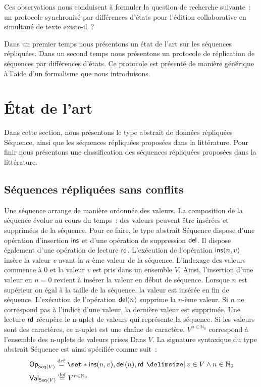 Ces observations nous conduisent à formuler la question de recherche suivante~: un protocole synchronisé par différences d'états pour l'édition collaborative en simultané de texte existe-il~?

Dans un premier temps nous présentons un état de l'art sur les séquences répliquées.
Dans un second temps nous présentons un protocole de réplication de séquences par différences d'états.
Ce protocole est présenté de manière générique à l'aide d'un formalisme que nous introduisons.


\section{État de l'art}\label{sec:state-art-seq}

Dans cette section, nous présentons le type abstrait de données répliquées Séquence, ainsi que les séquences répliquées proposées dans la littérature.
Pour finir nous présentons une classification des séquences répliquées proposées dans la littérature.

\subsection{Séquences répliquées sans conflits}\label{subsec:replseq}

Une séquence arrange de manière ordonnée des valeurs.
La composition de la séquence évolue au cours du temps~:
des valeurs peuvent être insérées et supprimées de la séquence.
Pour ce faire, le type abstrait Séquence dispose d'une opération d'insertion $\operatorname{\mathsf{ins}}$ et d'une opération de suppression $\operatorname{\mathsf{del}}$.
Il dispose également d'une opération de lecture $\operatorname{\mathsf{rd}}$.
L'exécution de l'opération $\operatorname{\mathsf{ins}}(n, v)$ insère la valeur $v$ avant la $n$-ème valeur de la séquence.
L'indexage des valeurs commence à $0$ et la valeur $v$ est pris dans un ensemble $V$.
Ainsi, l'insertion d'une valeur en $n = 0$ revient à insérer la valeur en début de séquence.
Lorsque $n$ est supérieur ou égal à la taille de la séquence, la valeur est insérée en fin de séquence.
L'exécution de l'opération $\operatorname{\mathsf{del}}(n)$ supprime la $n$-ème valeur.
Si $n$ ne correspond pas à l'indice d'une valeur, la dernière valeur est supprimée.
Une lecture $\operatorname{\mathsf{rd}}$ récupère le n-uplet de valeurs qui représente la séquence.
Si les valeurs sont des caractères, ce n-uplet est une chaîne de caractère.
$V^{n \in \mathbb{N}_0}$ correspond à l'ensemble des n-uplets de valeurs prises Dans $V$.
La signature syntaxique du type abstrait Séquence est ainsi spécifiée comme suit~:
%
\begin{align*}
&\trm{Op}_{\trm{Seq}\tuple*{V}} \defeq \set*{\trm{ins}(n, v), \trm{del}(n), \trm{rd} \given v \in V \land n \in \mathbb{N}_0}\\
&\trm{Val}_{\trm{Seq}\tuple*{V}} \defeq V^{n \in \mathbb{N}_0}
\end{align*}

